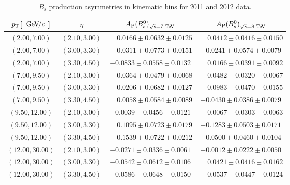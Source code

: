 \begin{table}[h]
\caption{$B_s$ production asymmetries in kinematic bins for 2011 and 2012 data. \cite{Aaij:2017mso}}
\centering
\begin{tabular}{c c c c}
\mbox{$p_{\rm T}$}\xspace [ $ {\mathrm{\,Ge\kern -0.1em V\!/}c}$ \xspace] & $\eta$ & $A_{\rm P}( B\xspace\xspace^0_ s\xspace\xspace\xspace)_{\sqrt{s}\xspace = 7\, \mathrm{\,Te\kern -0.1em V}\xspace}$ & $A_{\rm P}( B\xspace\xspace^0_ s\xspace\xspace\xspace)_{\sqrt{s}\xspace = 8\, \mathrm{\,Te\kern -0.1em V}\xspace}$ \\
\hline
$(2.00,   7.00)$   &  $(2.10,  3.00)$  &  $  \phantom{-}0.0166  \pm  0.0632  \pm  0.0125  $  &  $  \phantom{-}0.0412  \pm  0.0416  \pm  0.0150  $     \\
$(2.00,   7.00)$   &  $(3.00,  3.30)$  &  $  \phantom{-}0.0311  \pm  0.0773  \pm  0.0151  $  &  $  -0.0241            \pm  0.0574  \pm  0.0079  $    \\
$(2.00,   7.00)$   &  $(3.30,  4.50)$  &  $  -0.0833            \pm  0.0558  \pm  0.0132  $     &  $  \phantom{-}0.0166  \pm  0.0391  \pm  0.0092  $        \\
$(7.00,   9.50)$   &  $(2.10,  3.00)$  &  $  \phantom{-}0.0364  \pm  0.0479  \pm  0.0068  $   &  $  \phantom{-}0.0482  \pm  0.0320  \pm  0.0067  $   \\
$(7.00,   9.50)$   &  $(3.00,  3.30)$  &  $  \phantom{-}0.0206  \pm  0.0682  \pm  0.0127  $ &  $  \phantom{-}0.0983  \pm  0.0470  \pm  0.0155  $     \\
$(7.00,   9.50)$   &  $(3.30,  4.50)$  &  $  \phantom{-}0.0058  \pm  0.0584  \pm  0.0089  $  &  $  -0.0430            \pm  0.0386  \pm  0.0079  $   \\
$(9.50,   12.00)$  &  $(2.10,  3.00)$  &  $  -0.0039            \pm  0.0456  \pm  0.0121  $      &  $  \phantom{-}0.0067  \pm  0.0303  \pm  0.0063  $     \\
$(9.50,   12.00)$  &  $(3.00,  3.30)$  &  $  \phantom{-}0.1095  \pm  0.0723  \pm  0.0179  $  &  $  -0.1283            \pm  0.0503  \pm  0.0171  $     \\
$(9.50,   12.00)$  &  $(3.30,  4.50)$  &  $  \phantom{-}0.1539  \pm  0.0722  \pm  0.0212  $  &  $  -0.0500            \pm  0.0460  \pm  0.0104  $  \\
$(12.00,  30.00)$  &  $(2.10,  3.00)$  &  $  -0.0271            \pm  0.0336  \pm  0.0061  $  &  $  -0.0012            \pm  0.0222  \pm  0.0050  $        \\
$(12.00,  30.00)$  &  $(3.00,  3.30)$  &  $  -0.0542            \pm  0.0612  \pm  0.0106  $    &  $  \phantom{-}0.0421  \pm  0.0416  \pm  0.0162  $     \\
$(12.00,  30.00)$  &  $(3.30,  4.50)$  &  $  -0.0586            \pm  0.0648  \pm  0.0150  $     &  $  \phantom{-}0.0537  \pm  0.0447  \pm  0.0124  $      \\
\end{tabular}
\label{tab:Ap}
\end{table}